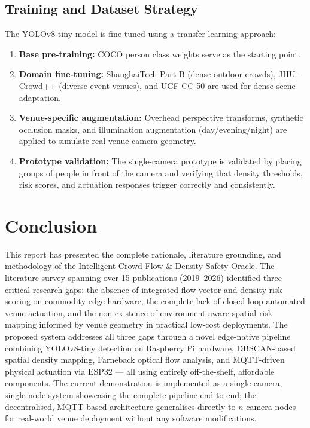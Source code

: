 \documentclass[12pt,a4paper]{article}
\begin{document}
\subsection{Training and Dataset Strategy}

The YOLOv8-tiny model is fine-tuned using a transfer learning approach:

\begin{enumerate}[leftmargin=1.5em, itemsep=3pt]
  \item \textbf{Base pre-training:} COCO person class weights serve as the starting point.
  \item \textbf{Domain fine-tuning:} ShanghaiTech Part B (dense outdoor crowds), JHU-Crowd++ (diverse event venues), and UCF-CC-50 are used for dense-scene adaptation.
  \item \textbf{Venue-specific augmentation:} Overhead perspective transforms, synthetic occlusion masks, and illumination augmentation (day/evening/night) are applied to simulate real venue camera geometry.
  \item \textbf{Prototype validation:} The single-camera prototype is validated by placing groups of people in front of the camera and verifying that density thresholds, risk scores, and actuation responses trigger correctly and consistently.
\end{enumerate}

\section{Conclusion}

This report has presented the complete rationale, literature grounding, and methodology of the Intelligent Crowd Flow \& Density Safety Oracle. The literature survey spanning over 15 publications (2019--2026) identified three critical research gaps: the absence of integrated flow-vector and density risk scoring on commodity edge hardware, the complete lack of closed-loop automated venue actuation, and the non-existence of environment-aware spatial risk mapping informed by venue geometry in practical low-cost deployments. The proposed system addresses all three gaps through a novel edge-native pipeline combining YOLOv8-tiny detection on Raspberry Pi hardware, DBSCAN-based spatial density mapping, Farneback optical flow analysis, and MQTT-driven physical actuation via ESP32 — all using entirely off-the-shelf, affordable components. The current demonstration is implemented as a single-camera, single-node system showcasing the complete pipeline end-to-end; the decentralised, MQTT-based architecture generalises directly to $n$ camera nodes for real-world venue deployment without any software modifications.
\end{document}
